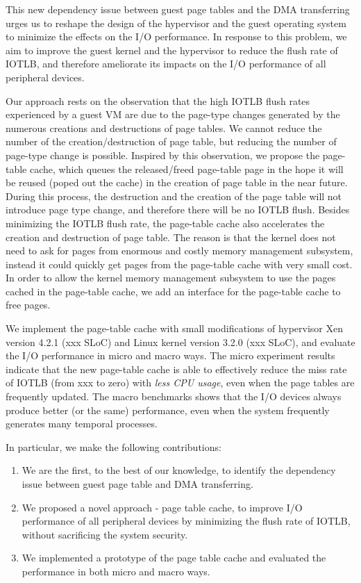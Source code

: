 
This new dependency issue between guest page tables and the DMA transferring urges us to reshape the design of the hypervisor and the guest operating system to minimize the effects on the I/O performance.
In response to this problem, we aim to improve the guest kernel and the hypervisor to reduce the flush rate of IOTLB, and therefore ameliorate its impacts on the I/O performance of all peripheral devices.

Our approach rests on the observation that the high IOTLB flush rates experienced by a guest VM
are due to the page-type changes generated by the numerous creations and destructions of page tables.
We cannot reduce the number of the creation/destruction of page table, but reducing the number of page-type change is possible.
Inspired by this observation, we propose the page-table cache, which queues the released/freed page-table page in the hope
it will be reused (poped out the cache) in the creation of page table in the near future.
During this process, the destruction and the creation of the page table will not introduce page type change, and therefore there will be no IOTLB flush.
Besides minimizing the IOTLB flush rate, the page-table cache also accelerates the creation and destruction of page table.
The reason is that the kernel does not need to ask for pages from enormous and costly memory management subsystem, instead it could quickly get pages from the page-table cache with very small cost.
In order to allow the kernel memory management subsystem to use the pages cached in the page-table cache, we add an interface for the page-table cache to free pages.

We implement the page-table cache with small modifications of hypervisor Xen version 4.2.1 (xxx SLoC) and Linux kernel version 3.2.0 (xxx SLoC), and evaluate the I/O performance in micro and macro ways.
The micro experiment results indicate that the new page-table cache is able to effectively reduce the miss rate of IOTLB (from xxx to zero) with \emph{less CPU usage}, even when the page tables are frequently updated.
The macro benchmarks shows that the I/O devices always produce better (or the same) performance, even when the system frequently generates many temporal processes.


In particular, we make the following contributions:
\begin{enumerate}
\item We are the first, to the best of our knowledge, to identify the dependency issue between guest page table and DMA transferring.
\item We proposed a novel approach - page table cache, to improve I/O performance of all peripheral devices by minimizing the flush rate of IOTLB, without sacrificing the system security.
\item We implemented a prototype of the page table cache and evaluated the performance in both micro and macro ways.
\end{enumerate}

